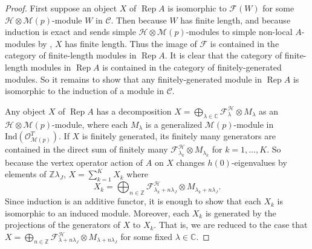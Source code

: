 \documentclass[11pt, reqno]{amsart}
\theoremstyle{definition}\newtheorem{defi}[thm]{Definition}
\theoremstyle{definition}\newtheorem{rem}[thm]{Remark}
\theoremstyle{definition}\newtheorem{exam}[thm]{Example}
\theoremstyle{definition}\newtheorem{assum}[thm]{Assumption}
\newcommand{\cH}{\mathcal{H}}
\newcommand{\cM}{\mathcal{M}}
\newcommand{\cF}{\mathcal{F}}
\newcommand{\cO}{\mathcal{O}}
\newcommand{\cC}{\mathcal{C}}
\newcommand{\CC}{\mathbb{C}}
\newcommand{\ZZ}{\mathbb{Z}}
\newcommand{\ind}{\mathrm{Ind}}
\DeclareMathOperator{\rep}{Rep}
\newcommand{\repA}{\rep A}
\begin{document}
\begin{proof}
First suppose an object $X$ of $\repA$ is isomorphic to $\cF(W)$ for some $\cH\otimes\cM(p)$-module $W$ in $\cC$. Then because $W$ has finite length, and because induction is exact and sends simple $\cH\otimes\cM(p)$-modules to simple non-local $A$-modules by \cite[Proposition 4.4]{CKM-exts}, $X$ has finite length. Thus the image of $\cF$ is contained in the category of finite-length modules in $\repA$. It is clear that the category of finite-length modules in $\repA$ is contained in the category of finitely-generated modules. So it remains to show that any finitely-generated module in $\repA$ is isomorphic to the induction of a module in $\cC$. 


Any object $X$ of $\repA$ has a decomposition $X=\bigoplus_{\lambda\in\CC} \cF^\cH_\lambda\otimes M_\lambda$ as an $\cH\otimes\cM(p)$-module, where each $M_\lambda$ is a generalized $\cM(p)$-module in $\ind(\cO^T_{\cM(p)})$. If $X$ is finitely generated, its finitely many generators are contained in the direct sum of finitely many $\cF^\cH_{\lambda_k}\otimes M_{\lambda_k}$ for $k=1,\ldots,K$. So because the vertex operator action of $A$ on $X$ changes $h(0)$-eigenvalues by elements of $\ZZ\lambda_J$, $X=\sum_{k=1}^K X_k$ where
\begin{equation*}
X_k=\bigoplus_{n\in\ZZ} \cF^\cH_{\lambda_k+n\lambda_J}\otimes M_{\lambda_k+n\lambda_J}.
\end{equation*}
Since induction is an additive functor, it is enough to show that each $X_k$ is isomorphic to an induced module. Moreover, each $X_k$ is generated by the projections of the generators of $X$ to $X_k$. That is, we are reduced to the case that $X=\bigoplus_{n\in\ZZ} \cF^\cH_{\lambda+n\lambda_J}\otimes M_{\lambda+n\lambda_J}$ for some fixed $\lambda\in\CC$.




\end{proof}
\end{document}
